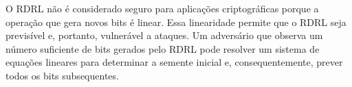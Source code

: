 







O RDRL não é considerado seguro para aplicações criptográficas porque a operação que gera novos bits é linear.
Essa linearidade permite que o RDRL seja previsível e, portanto, vulnerável a ataques.
Um adversário que observa um número suficiente de bits gerados pelo RDRL pode resolver um sistema de equações lineares para determinar a semente inicial e, consequentemente, prever todos os bits subsequentes.

